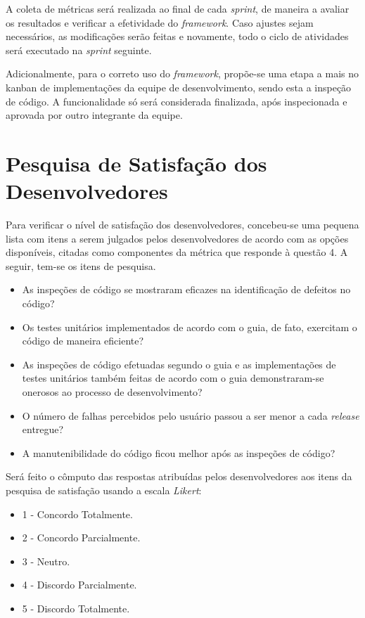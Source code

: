 A coleta de métricas será realizada ao final de cada \textit{sprint}, de maneira a avaliar os resultados e verificar a efetividade do \textit{framework}. Caso ajustes sejam necessários, as modificações serão feitas e novamente, todo o ciclo de atividades será executado na \textit{sprint} seguinte.

Adicionalmente, para o correto uso do \textit{framework}, propõe-se uma etapa a mais no kanban de implementações da equipe de desenvolvimento, sendo esta a inspeção de código. A funcionalidade só será considerada finalizada, após inspecionada e aprovada por outro integrante da equipe.

\section{Pesquisa de Satisfação dos Desenvolvedores}

Para verificar o nível de satisfação dos desenvolvedores, concebeu-se uma pequena lista com itens a serem julgados pelos desenvolvedores de acordo com as opções disponíveis, citadas como componentes da métrica que responde à questão 4. A seguir, tem-se os itens de pesquisa.

\begin{itemize}
	\item As inspeções de código se mostraram eficazes na identificação de defeitos no código?

	\item Os testes unitários implementados de acordo com o guia, de fato, exercitam o código de maneira eficiente?

	\item As inspeções de código efetuadas segundo o guia e as implementações de testes unitários também feitas de acordo com o guia demonstraram-se onerosos ao processo de desenvolvimento?

	\item O número de falhas percebidos pelo usuário passou a ser menor a cada \textit{release} entregue?

	\item A manutenibilidade do código ficou melhor após as inspeções de código?
\end{itemize}

Será feito o cômputo das respostas atribuídas pelos desenvolvedores aos itens da pesquisa de satisfação usando a escala \textit{Likert}: 

\begin{itemize}
	\item {1 - Concordo Totalmente}.
	\item {2 - Concordo Parcialmente}.
	\item {3 - Neutro}.
	\item {4 - Discordo Parcialmente}.
	\item {5 - Discordo Totalmente}.
\end{itemize}

